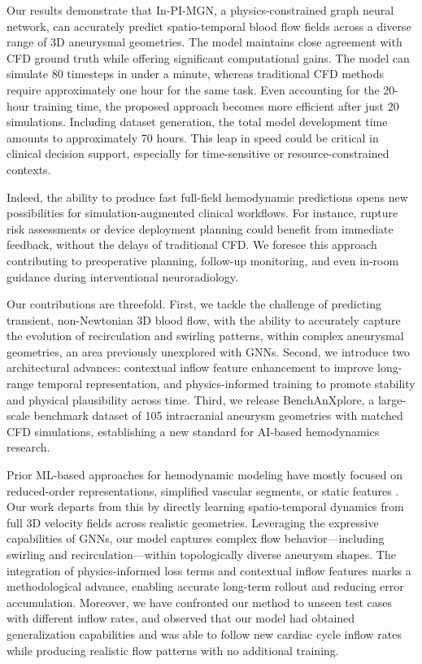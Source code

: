 Our results demonstrate that In-PI-MGN, a physics-constrained graph neural network, can accurately predict spatio-temporal blood flow fields across a diverse range of 3D aneurysmal geometries. The model maintains close agreement with CFD ground truth while offering significant computational gains. The model can simulate 80 timesteps in under a minute, whereas traditional CFD methods require approximately one hour for the same task. Even accounting for the 20-hour training time, the proposed approach becomes more efficient after just 20 simulations. Including dataset generation, the total model development time amounts to approximately 70 hours. This leap in speed could be critical in clinical decision support, especially for time-sensitive or resource-constrained contexts.

Indeed, the ability to produce fast full-field hemodynamic predictions opens new possibilities for simulation-augmented clinical workflows. For instance, rupture risk assessments or device deployment planning could benefit from immediate feedback, without the delays of traditional CFD. We foresee this approach contributing to preoperative planning, follow-up monitoring, and even in-room guidance during interventional neuroradiology.

Our contributions are threefold. First, we tackle the challenge of predicting transient, non-Newtonian 3D blood flow, with the ability to accurately capture the evolution of recirculation and swirling patterns, within complex aneurysmal geometries, an area previously unexplored with GNNs. Second, we introduce two architectural advances: contextual inflow feature enhancement to improve long-range temporal representation, and physics-informed training to promote stability and physical plausibility across time. Third, we release BenchAnXplore, a large-scale benchmark dataset of 105 intracranial aneurysm geometries with matched CFD simulations, establishing a new standard for AI-based hemodynamics research.

Prior ML-based approaches for hemodynamic modeling have mostly focused on reduced-order representations, simplified vascular segments, or static features \cite{pegolotti_learning_2024, li_prediction_2021,sen_physics-informed_2024}. Our work departs from this by directly learning spatio-temporal dynamics from full 3D velocity fields across realistic geometries. Leveraging the expressive capabilities of GNNs, our model captures complex flow behavior—including swirling and recirculation—within topologically diverse aneurysm shapes. The integration of physics-informed loss terms and contextual inflow features marks a methodological advance, enabling accurate long-term rollout and reducing error accumulation. Moreover, we have confronted our method to unseen test cases with different inflow rates, and observed that our model had obtained generalization capabilities and was able to follow new cardiac cycle inflow rates while producing realistic flow patterns with no additional training.

